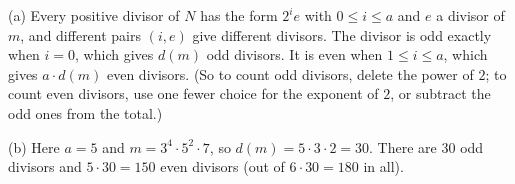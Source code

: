 (a) Every positive divisor of $N$ has the form $2^i e$ with $0\le i\le a$ and $e$ a divisor of $m$, and different pairs $(i,e)$ give different divisors. The divisor is odd exactly when $i=0$, which gives $d(m)$ odd divisors. It is even when $1\le i\le a$, which gives $a\cdot d(m)$ even divisors. (So to count odd divisors, delete the power of $2$; to count even divisors, use one fewer choice for the exponent of $2$, or subtract the odd ones from the total.)

(b) Here $a=5$ and $m=3^4\cdot5^2\cdot7$, so $d(m)=5\cdot3\cdot2=30$. There are $\boxed{30}$ odd divisors and $5\cdot30=\boxed{150}$ even divisors (out of $6\cdot30=180$ in all).
